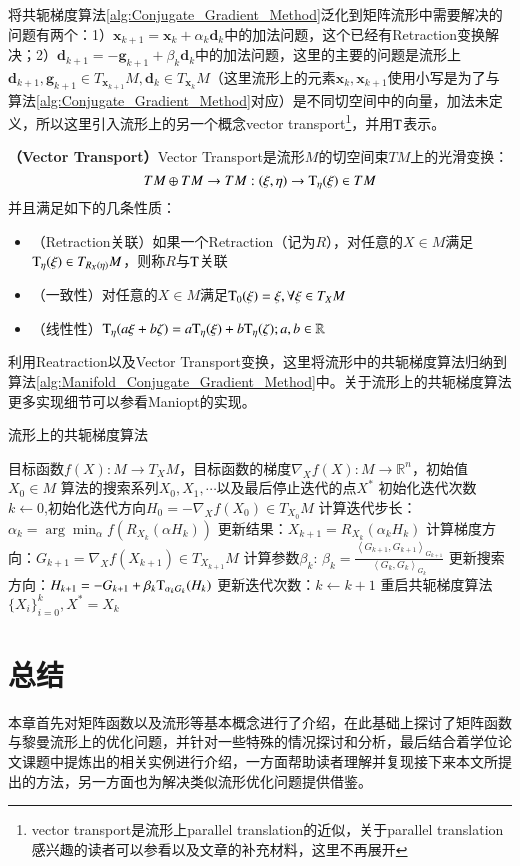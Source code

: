 将共轭梯度算法\ref{alg:Conjugate_Gradient_Method}泛化到矩阵流形中需要解决的问题有两个：1）$\bm{x}_{k+1}=\bm{x}_{k}+\alpha_{k}\bm{d}_k$中的加法问题，这个已经有Retraction变换解决；2）$\bm{d}_{k+1}=-\bm{g}_{k+1}+\beta_{k}\bm{d}_{k}$中的加法问题，这里的主要的问题是流形上$\bm{d}_{k+1},\bm{g}_{k+1} \in T_{\bm{x}_{k+1}}M,\bm{d}_{k} \in T_{\bm{x}_{k}}M$（这里流形上的元素$\bm{x}_{k},\bm{x}_{k+1}$使用小写是为了与算法\ref{alg:Conjugate_Gradient_Method}对应）是不同切空间中的向量，加法未定义，所以这里引入流形上的另一个概念vector transport\footnote{vector transport是流形上parallel translation的近似，关于parallel translation感兴趣的读者可以参看\cite{Maniopt_book,Maniopt_DiscreteCurveFitting}以及文章\cite{RCCA}的补充材料，这里不再展开}，并用${\rm T}$表示。
\begin{definition}
\label{Vector_Transport}
\textbf{（Vector Transport）}Vector Transport是流形$M$的切空间束$TM$上的光滑变换：
\begin{displaymath}
TM\oplus TM \rightarrow TM:(\xi,\eta)\rightarrow {\rm T}_{\eta}(\xi) \in TM
\end{displaymath}
并且满足如下的几条性质：
\begin{itemize}
\label{Vector_Transport_Properties}
\item （Retraction关联）如果一个Retraction（记为$R$），对任意的$X \in M$满足${\rm T}_{\eta}(\xi)\in T_{R_{X}(\eta)}M$，则称$R$与${\rm T}$关联
\item （一致性）对任意的$X \in M$满足${\rm T}_{0}(\xi)=\xi,\forall \xi \in T_{X}M$
\item （线性性）${\rm T}_{\eta}(a\xi+b\zeta)=a{\rm T}_{\eta}(\xi)+b{\rm T}_{\eta}(\zeta);a,b \in \mathbb{R}$
\end{itemize}
\end{definition}
利用Reatraction以及Vector Transport变换，这里将流形中的共轭梯度算法归纳到算法\ref{alg:Manifold_Conjugate_Gradient_Method}中。关于流形上的共轭梯度算法更多实现细节可以参看Maniopt\cite{Maniopt_tool}的实现。
\begin{algorithm}[t]
\caption{流形上的共轭梯度算法}
\label{alg:Manifold_Conjugate_Gradient_Method}
\begin{algorithmic}[1]
\REQUIRE 目标函数$f(X):M \rightarrow T_{X}M$，目标函数的梯度$\nabla_X f(X):M \rightarrow \mathbb{R}^{n}$，初始值$X_0 \in M$
\ENSURE 算法的搜索系列$X_0,X_1,\cdots$以及最后停止迭代的点$X^{*}$
\STATE 初始化迭代次数$k \leftarrow 0$,初始化迭代方向$H_{0}=-\nabla_X f(X_0)\in T_{X_0}M$
\STATE 计算迭代步长：$\alpha_{k}=\arg\min_{\alpha}f(R_{X_{k}}(\alpha H_{k}))$
\STATE 更新结果：$X_{k+1}=R_{X_{k}}(\alpha_{k}H_{k})$
\STATE 计算梯度方向：$G_{k+1}=\nabla_{X}f(X_{k+1}) \in T_{X_{k+1}}M$
\STATE 计算参数$\beta_{k}$: $\beta_{k}=\frac{\left<G_{k+1},G_{k+1}\right>_{G_{k+1}}}{\left<G_{k},G_{k}\right>_{G_{k}}}$
\STATE 更新搜索方向：$H_{k+1}=-G_{k+1}+\beta_{k}{\rm T}_{\alpha_{k}G_{k}}(H_{k})$
\STATE 更新迭代次数：$k\leftarrow k+1$
\STATE 重启共轭梯度算法
\ENDIF
\ENDWHILE
\RETURN $\{X_i\}_{i=0}^{k},X^{*}=X_{k}$
\end{algorithmic}
\end{algorithm}
\section{总结}
\label{opt_conclusion}
本章首先对矩阵函数以及流形等基本概念进行了介绍，在此基础上探讨了矩阵函数与黎曼流形上的优化问题，并针对一些特殊的情况探讨和分析，最后结合着学位论文课题中提炼出的相关实例进行介绍，一方面帮助读者理解并复现接下来本文所提出的方法，另一方面也为解决类似流形优化问题提供借鉴。